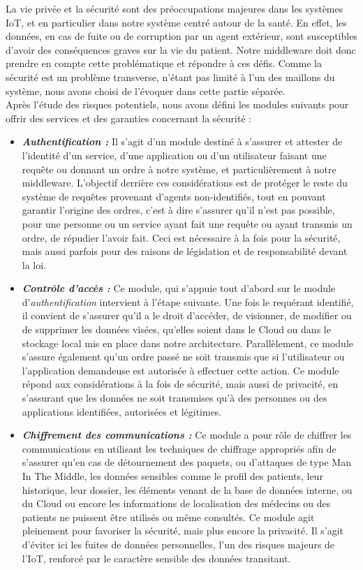 La vie privée et la sécurité sont des préoccupations majeures dans les systèmes IoT, et en particulier dans notre système centré autour de la santé. En effet, les données, en cas de fuite ou de corruption par un agent extérieur, sont susceptibles d'avoir des conséquences graves sur la vie du patient. Notre middleware doit donc prendre en compte cette problématique et répondre à ces défis. Comme la sécurité est un problème transverse, n'étant pas limité à l'un des maillons du système, nous avons choisi de l'évoquer dans cette partie séparée. \\Après l'étude des risques potentiels, nous avons défini les modules suivants pour offrir des services et des garanties concernant la sécurité :\\
\begin{itemize}
\item \textbf{\textit{Authentification :}} Il s'agit d'un module destiné à s'assurer et attester de l'identité d'un service, d'une application ou d'un utilisateur faisant une requête ou donnant un ordre à notre système, et particulièrement à notre middleware. L'objectif derrière ces considérations est de protéger le reste du système de requêtes provenant d'agents non-identifiés, tout en pouvant garantir l'origine des ordres, c'est à dire s'assurer qu'il n'est pas possible, pour une personne ou un service ayant fait une requête ou ayant transmis un ordre, de répudier l'avoir fait. Ceci est nécessaire à la fois pour la sécurité, mais aussi parfois pour des raisons de législation et de responsabilité devant la loi.
\item \textbf{\textit{Contrôle d'accès :}} Ce module, qui s'appuie tout d'abord sur le module d'\textit{authentification} intervient à l'étape suivante. Une fois le requérant identifié, il convient de s'assurer qu'il a le droit d'accéder, de visionner, de modifier ou de supprimer les données visées, qu'elles soient dans le Cloud ou dans le stockage local mis en place dans notre architecture. Parallèlement, ce module s'assure également qu'un ordre passé ne soit transmis que si l'utilisateur ou l'application demandeuse est autorisée à effectuer cette action. Ce module répond aux considérations à la fois de sécurité, mais aussi de privacité, en s'assurant que les données ne soit transmises qu'à des personnes ou des applications identifiées, autorisées et légitimes.
\item \textbf{\textit{Chiffrement des communications :}} Ce module a pour rôle de chiffrer les communications en utilisant les techniques de chiffrage appropriés afin de s'assurer qu'en cas de détournement des paquets, ou d'attaques de type Man In The Middle, les données sensibles comme le profil des patients, leur historique, leur dossier, les éléments venant de la base de données interne, ou du Cloud ou encore les informations de localisation des médecins ou des patients ne puissent être utilisés ou même consultés. Ce module agit pleinement pour favoriser la sécurité, mais plus encore la privacité. Il s'agit d'éviter ici les fuites de données personnelles, l'un des risques majeurs de l'IoT, renforcé par le caractère sensible des données transitant.

\end{itemize}
